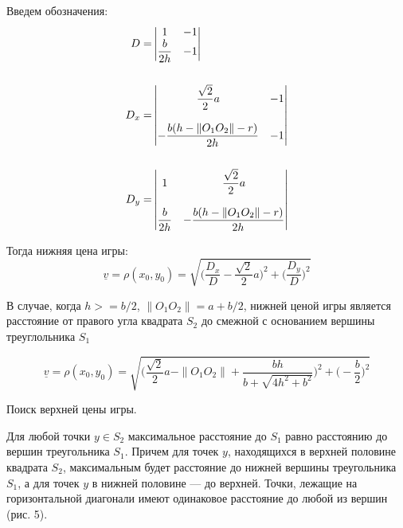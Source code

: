 \documentclass[12pt,a4paper]{article}
\begin{document}
Введем обозначения:
\[
  \begin{aligned}
    D = &
    \begin{vmatrix}
      1 & -1 \\
      \dfrac{b}{2h} & - 1
    \end{vmatrix} \\ \vspace{.5cm} \\
    D_x = &
    \begin{vmatrix}
      \dfrac{\sqrt{2}}{2}a & -1 \\ \vspace{0cm}\\
      -\dfrac{b(h - \|O_1 O_2\|-r)}{2h} & - 1
    \end{vmatrix} \\ \vspace{.5cm} \\
    D_y = &
    \begin{vmatrix}
      1 & \dfrac{\sqrt{2}}{2}a \\ \vspace{0cm}\\
      \dfrac{b}{2h} & -\dfrac{b(h - \|O_1 O_2\|-r)}{2h}
    \end{vmatrix}
  \end{aligned}
\]

Тогда нижняя цена игры:
\[
  \underline{v} = \rho(x_0, y_0) =
  \sqrt{\bigl(\frac{D_x}{D} - \frac{\sqrt{2}}{2}a\bigr)^2 + \bigl(\frac{D_y}{D}\bigr)^2} 
\]

В случае, когда $h >= b/2$, $\| O_1 O_2 \| = a + b/2$, нижней ценой игры
является расстояние от правого угла квадрата $S_2$ до смежной с основанием
вершины треуглольника $S_1$

\[
  \underline{v} = \rho(x_0, y_0) = \sqrt{
    \bigl(\frac{\sqrt{2}}{2}a - \|O_1 O_2\|+\frac{bh}{b+\sqrt{4h^2+b^2}}\bigr)^2 +
    \bigl(-\frac{b}{2}\bigr)^2
  }
\]

\vspace{.5cm}
Поиск верхней цены игры.

Для любой точки $y \in S_2$ максимальное расстояние до $S_1$ равно
расстоянию до вершин треугольника $S_1$.
Причем для точек $y$, находящихся в верхней половине квадрата $S_2$, максимальным
будет расстояние до нижней вершины треугольника $S_1$, а для точек $y$ в нижней
половине --- до верхней. Точки, лежащие на горизонтальной диагонали имеют одинаковое
расстояние до любой из вершин (рис. 5).
\end{document}
